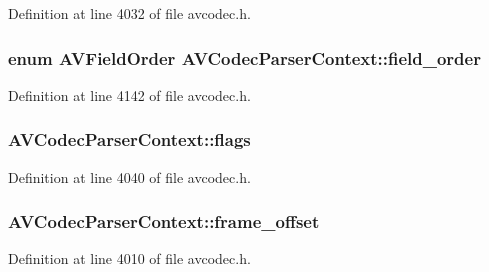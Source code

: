 Definition at line 4032 of file avcodec.\+h.

\subsubsection[{\texorpdfstring{field\+\_\+order}{field_order}}]{\setlength{\rightskip}{0pt plus 5cm}enum {\bf A\+V\+Field\+Order} A\+V\+Codec\+Parser\+Context\+::field\+\_\+order}\hypertarget{struct_a_v_codec_parser_context_a4c43b9d404eb4a07aab63c98b0093941}{}\label{struct_a_v_codec_parser_context_a4c43b9d404eb4a07aab63c98b0093941}


Definition at line 4142 of file avcodec.\+h.

\subsubsection[{\texorpdfstring{flags}{flags}}]{ A\+V\+Codec\+Parser\+Context\+::flags}\hypertarget{struct_a_v_codec_parser_context_ab6cc0e73ffbec72c438413c6c6a4e326}{}\label{struct_a_v_codec_parser_context_ab6cc0e73ffbec72c438413c6c6a4e326}


Definition at line 4040 of file avcodec.\+h.

\subsubsection[{\texorpdfstring{frame\+\_\+offset}{frame_offset}}]{ A\+V\+Codec\+Parser\+Context\+::frame\+\_\+offset}\hypertarget{struct_a_v_codec_parser_context_ac3fc3d38b1f4e864535a9011ac2526e3}{}\label{struct_a_v_codec_parser_context_ac3fc3d38b1f4e864535a9011ac2526e3}


Definition at line 4010 of file avcodec.\+h.

